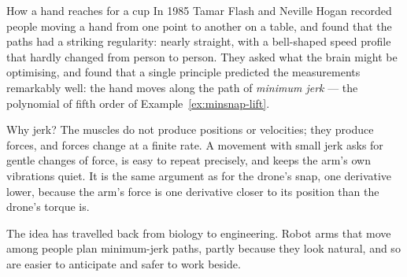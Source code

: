 \begin{curiosity}{How a hand reaches for a cup}
In 1985 Tamar Flash and Neville Hogan recorded people moving a hand from one point to another on a table, and found that the paths had a striking regularity: nearly straight, with a bell-shaped speed profile that hardly changed from person to person. They asked what the brain might be optimising, and found that a single principle predicted the measurements remarkably well: the hand moves along the path of \emph{minimum jerk} — the polynomial of fifth order of Example~\ref{ex:minsnap-lift}.

Why jerk? The muscles do not produce positions or velocities; they produce forces, and forces change at a finite rate. A movement with small jerk asks for gentle changes of force, is easy to repeat precisely, and keeps the arm's own vibrations quiet. It is the same argument as for the drone's snap, one derivative lower, because the arm's force is one derivative closer to its position than the drone's torque is.

The idea has travelled back from biology to engineering. Robot arms that move among people plan minimum-jerk paths, partly because they look natural, and so are easier to anticipate and safer to work beside.
\end{curiosity}

